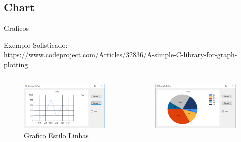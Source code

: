 		\subsection{Chart}

		\begin{frame}
		
		
		\begin{CaixaModelo01}{Graficos}
			
Exemplo Sofisticado:\\
https://www.codeproject.com/Articles/32836/A-simple-C-library-for-graph-plotting

	\begin{columns}
		\begin{column}{0.33\textwidth}
			\begin{figure}
				\includegraphics[scale=.2]{./Figuras/Grafico01}
				\caption{Grafico Estilo Linhas}
				\label{fig:Grafico01}
			\end{figure}
		\end{column}
		\begin{column}{0.33\textwidth}
			\begin{figure}
				\includegraphics[scale=.2]{./Figuras/Grafico02}

\end{figure}
\end{column}
\end{columns}
\end{CaixaModelo01}
\end{frame}
